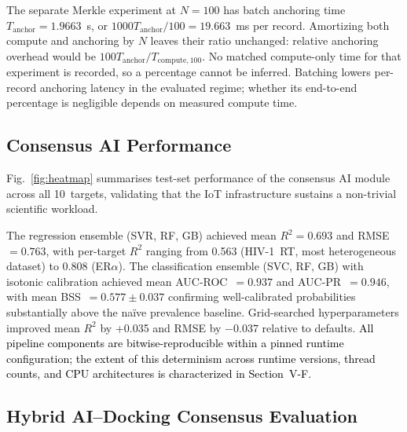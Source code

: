 \documentclass[conference]{IEEEtran}
\newcommand{\rev}[2]{#2}
\begin{document}
\rev{R1.4, R2.2}{The separate Merkle experiment at $N{=}100$
has batch anchoring time $T_{\mathrm{anchor}}=1.9663$~s,
or $1000T_{\mathrm{anchor}}/100=19.663$~ms per record.
Amortizing both compute and anchoring by $N$ leaves their
ratio unchanged: relative anchoring overhead would be
$100T_{\mathrm{anchor}}/T_{\mathrm{compute},100}$.
No matched compute-only time for that experiment is recorded,
so a percentage cannot be inferred. Batching lowers per-record anchoring
latency in the evaluated regime; whether its end-to-end
percentage is negligible depends on measured compute time.}

\subsection{\textbf{Consensus AI Performance}}
\label{sec:ai-results}

Fig.~\ref{fig:heatmap} summarises test-set performance of
the consensus AI module across all 10~targets, validating
that the IoT infrastructure sustains a non-trivial
scientific workload.



The regression ensemble (\rev{R2.1}{SVR, RF, GB}) achieved mean
$R^2{=}0.693$ and RMSE~$=0.763$, with per-target $R^2$
ranging from 0.563 (HIV-1~RT, most heterogeneous dataset)
to 0.808 (ER$\alpha$).
The classification ensemble (SVC, RF, GB) with isotonic
calibration achieved mean AUC-ROC~$=0.937$ and
AUC-PR~$=0.946$, with mean BSS~$=0.577{\pm}0.037$
confirming well-calibrated probabilities substantially
above the na\"ive prevalence baseline.
Grid-searched hyperparameters improved mean $R^2$ by +0.035 and RMSE by
$-0.037$ relative to defaults. \textcolor{black}{All pipeline components are
bitwise-reproducible within a pinned runtime configuration; the extent of
this determinism across runtime versions, thread counts, and CPU
architectures is characterized in Section~V-F.}


\subsection{\textbf{Hybrid AI--Docking Consensus Evaluation}}
\label{sec:hybrid-results}
\end{document}
